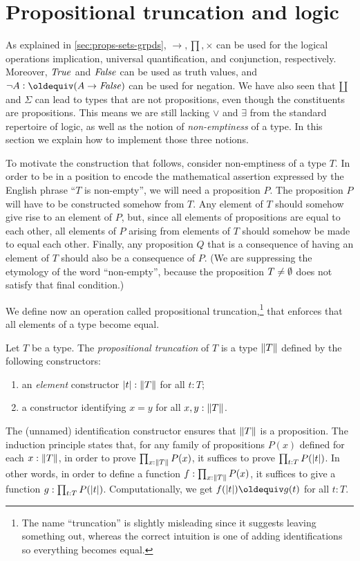 \section{Propositional truncation and logic}
\label{sec:prop-trunc}

As explained in \cref{sec:props-sets-grpds}, $\to,\prod,\times$ 
can be used for the logical operations implication, 
universal quantification, and conjunction, respectively.
Moreover, $\mathop{\mathit{True}}$ and $\mathop{\mathit{False}}$ can be used as truth values,
and $\neg A \defeq (A\to\false)$ can be used for negation.
We have also seen that ${\amalg}$ and $\Sigma$ can lead to types
that are not propositions, even though the constituents are
propositions. This means we are still lacking $\vee$ and $\exists$
from the standard repertoire of logic, as well as the notion of {\em non-emptiness} of a type.
In this section we explain how to implement those three notions.

To motivate the construction that follows, consider non-emptiness of a type $T$.  In order to be in a position to encode the mathematical
assertion expressed by the English phrase ``$T$ is non-empty'', we will need a proposition $P$.  The proposition $P$ will have to be constructed
somehow from $T$.  Any element of $T$ should somehow give rise to an element of $P$, but, since all elements of propositions are equal to each
other, all elements of $P$ arising from elements of $T$ should somehow be made to equal each other.  Finally, any proposition $Q$ that is a
consequence of having an element of $T$ should also be a consequence of $P$.  (We are suppressing the etymology of the word ``non-empty'',
because the proposition $T \ne \emptyset$ does not satisfy that final condition.)

We define now an operation called propositional truncation,\footnote{%
The name ``truncation'' is slightly misleading since it suggests leaving
something out, whereas the correct intuition is one of adding identifications
so everything becomes equal.}
that enforces that all elements of a type become equal.

\begin{definition}\label{def:prop-trunc}
Let $T$ be a type. The \emph{propositional truncation} of $T$
is a type  $\lVert T\rVert$ defined by the following constructors:
\begin{enumerate}
\item an \emph{element} constructor $\lvert t\rvert : \lVert T\rVert$ for all $t:T$;
\item a constructor identifying $x=y$  for all $x,y:\lVert T\rVert$.
\end{enumerate}
The (unnamed) identification constructor ensures that $\lVert T\rVert$ is a
proposition. The induction principle states that,
for any family of propositions $P(x)$ defined for each $x:\lVert T\rVert$, 
in order to prove $\prod_{x:\lVert T\rVert} P(x)$,
it suffices to prove $\prod_{t:T} P(\lvert t\rvert)$. In other
words, in order to define a function $f:\prod_{x:\lVert T\rVert} P(x)$,
it suffices to give a function $g: \prod_{t:T} P(\lvert t\rvert)$.
Computationally, we get $f(\trunc{t})\jdeq g(t)$ for all $t:T$. 
\end{definition}

